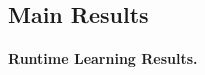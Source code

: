 \documentclass{article}
\theoremstyle{plain}
\theoremstyle{definition}
\theoremstyle{remark}
\begin{document}
\begin{table}[t]
\end{table}




\subsection{Main Results}

\paragraph{Runtime Learning Results.}
\end{document}
